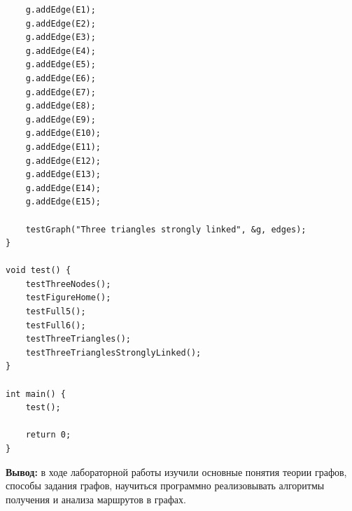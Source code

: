 \documentclass[a4paper,14pt]{extarticle}
\begin{document}
\begin{enumerate}[1.]
\begin{verbatim}
    g.addEdge(E1);
    g.addEdge(E2);
    g.addEdge(E3);
    g.addEdge(E4);
    g.addEdge(E5);
    g.addEdge(E6);
    g.addEdge(E7);
    g.addEdge(E8);
    g.addEdge(E9);
    g.addEdge(E10);
    g.addEdge(E11);
    g.addEdge(E12);
    g.addEdge(E13);
    g.addEdge(E14);
    g.addEdge(E15);

    testGraph("Three triangles strongly linked", &g, edges);
}

void test() {
    testThreeNodes();
    testFigureHome();
    testFull5();
    testFull6();
    testThreeTriangles();
    testThreeTrianglesStronglyLinked();
}

int main() {
    test();

    return 0;
}
                    \end{verbatim}
                    
        \end{enumerate}

\textbf{Вывод: } в ходе лабораторной работы изучили основные понятия теории графов, способы
задания графов, научиться программно реализовывать
алгоритмы получения и анализа маршрутов в графах.
\end{document}
